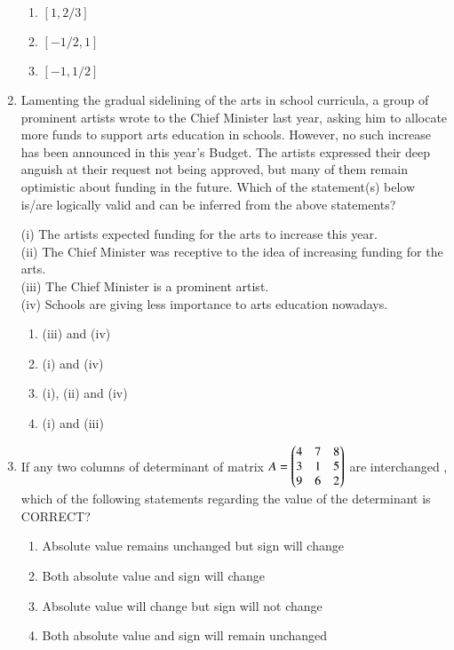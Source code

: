 \documentclass[journal]{IEEEtran}
\begin{document}
\begin{enumerate}
\begin{multicols}{4}
  
  \begin{enumerate}
    \item $[1,2 / 3]$
    \item $[-1 / 2,1]$
    \item  $[-1,1 / 2]$
  \end{enumerate}
  \end{multicols}
  
\item Lamenting the gradual sidelining of the arts in school curricula, a group of prominent artists wrote to the Chief Minister last year, asking him to allocate more funds to support arts education in schools. However, no such increase has been announced in this year's Budget. The artists expressed their deep anguish at their request not being approved, but many of them remain optimistic about funding in the future.
Which of the statement(s) below is/are logically valid and can be inferred from the above statements?

(i) The artists expected funding for the arts to increase this year.\\
(ii) The Chief Minister was receptive to the idea of increasing funding for the arts.\\
(iii) The Chief Minister is a prominent artist.\\
(iv) Schools are giving less importance to arts education nowadays.
 \hfill{}

			\begin{enumerate}
\item  (iii) and (iv)
\item (i) and (iv)
\item (i), (ii) and (iv)
\item (i) and (iii)
   \end{enumerate}

  \item If any two columns of determinant  of matrix $A =\begin{pmatrix}4 & 7 & 8\\ 3 & 1 & 5\\ 9 & 6 & 2\end{pmatrix}$ are interchanged , which of the following statements regarding the value of the determinant is CORRECT?
   \hfill{}
\begin{enumerate}
    \item Absolute value remains unchanged but sign will change
    \item Both absolute value and sign will change
    \item Absolute value will change but sign will not change
    \item Both absolute value and sign will remain unchanged
\end{enumerate}


\end{enumerate}
\end{document}
